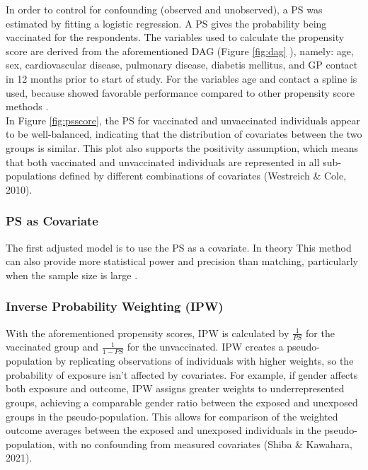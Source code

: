 \documentclass[
]{article}
\begin{document}
In order to control for confounding (observed and unobserved), a PS was estimated by fitting a logistic regression. A PS gives the probability being vaccinated for the respondents. The variables used to calculate the propensity score are derived from the aforementioned DAG (Figure \ref{fig:dag} ), namely: age, sex, cardiovascular disease, pulmonary disease, diabetis mellitus, and GP contact in 12 months prior to start of study. For the variables age and contact a spline is used, because showed favorable performance compared to other propensity score methods \citep{Tian}.\\
\hspace*{0.333em}\hspace*{0.333em}\hspace*{0.333em}\hspace*{0.333em}In Figure \ref{fig:psscore}, the PS for vaccinated and unvaccinated individuals appear to be well-balanced, indicating that the distribution of covariates between the two groups is similar. This plot also supports the positivity assumption, which means that both vaccinated and unvaccinated individuals are represented in all sub-populations defined by different combinations of covariates (Westreich \& Cole, 2010).

\hypertarget{ps-as-covariate}{%
\subsubsection{PS as Covariate}\label{ps-as-covariate}}

The first adjusted model is to use the PS as a covariate. In theory This method can also provide more statistical power and precision than matching, particularly when the sample size is large \citep{austin}.

\hypertarget{inverse-probability-weighting-ipw}{%
\subsubsection{Inverse Probability Weighting (IPW)}\label{inverse-probability-weighting-ipw}}

With the aforementioned propensity scores, IPW is calculated by \(\frac{1}{PS}\) for the vaccinated group and \(\frac{1}{1-PS}\) for the unvaccinated. IPW creates a pseudo-population by replicating observations of individuals with higher weights, so the probability of exposure isn't affected by covariates. For example, if gender affects both exposure and outcome, IPW assigns greater weights to underrepresented groups, achieving a comparable gender ratio between the exposed and unexposed groups in the pseudo-population. This allows for comparison of the weighted outcome averages between the exposed and unexposed individuals in the pseudo-population, with no confounding from measured covariates (Shiba \& Kawahara, 2021).\\
\end{document}
